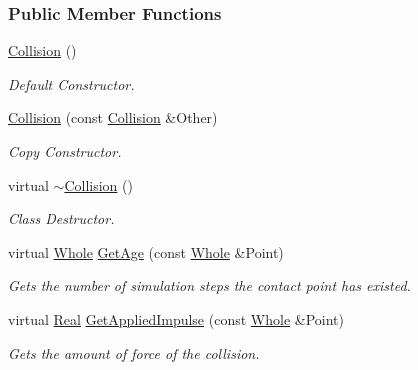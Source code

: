 \subsubsection*{Public Member Functions}
\begin{DoxyCompactItemize}
\item 
\hypertarget{classMezzanine_1_1Collision_a2eeacd2ab527b1d5e414917db41d580b}{
\hyperlink{classMezzanine_1_1Collision_a2eeacd2ab527b1d5e414917db41d580b}{Collision} ()}
\label{classMezzanine_1_1Collision_a2eeacd2ab527b1d5e414917db41d580b}

\begin{DoxyCompactList}\small\item\em Default Constructor. \item\end{DoxyCompactList}\item 
\hyperlink{classMezzanine_1_1Collision_a1170d2c2e674ab3e9b1bf68c91171db4}{Collision} (const \hyperlink{classMezzanine_1_1Collision}{Collision} \&Other)
\begin{DoxyCompactList}\small\item\em Copy Constructor. \item\end{DoxyCompactList}\item 
virtual \hyperlink{classMezzanine_1_1Collision_abeac6cfc637fe44493602a04f75c0232}{$\sim$Collision} ()
\begin{DoxyCompactList}\small\item\em Class Destructor. \item\end{DoxyCompactList}\item 
virtual \hyperlink{namespaceMezzanine_adcbb6ce6d1eb4379d109e51171e2e493}{Whole} \hyperlink{classMezzanine_1_1Collision_ad9d72f1d883214242803b72d1b82c343}{GetAge} (const \hyperlink{namespaceMezzanine_adcbb6ce6d1eb4379d109e51171e2e493}{Whole} \&Point)
\begin{DoxyCompactList}\small\item\em Gets the number of simulation steps the contact point has existed. \item\end{DoxyCompactList}\item 
virtual \hyperlink{namespaceMezzanine_a726731b1a7df72bf3583e4a97282c6f6}{Real} \hyperlink{classMezzanine_1_1Collision_aa53aa5016ea75885b9be4f317968b407}{GetAppliedImpulse} (const \hyperlink{namespaceMezzanine_adcbb6ce6d1eb4379d109e51171e2e493}{Whole} \&Point)
\begin{DoxyCompactList}\small\item\em Gets the amount of force of the collision. \item\end{DoxyCompactList}\item 

\end{DoxyCompactItemize}
